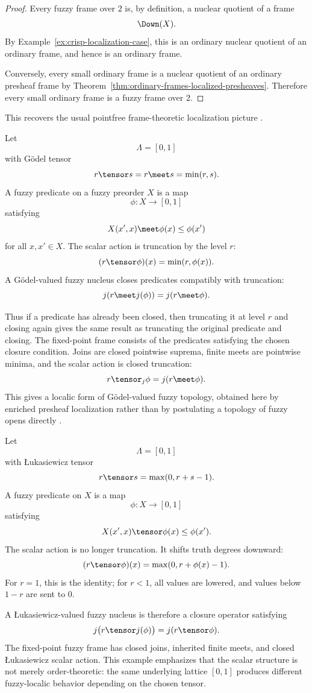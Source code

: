 \begin{proof}
Every fuzzy frame over \(2\) is, by definition, a nuclear quotient of a frame
\[
    \Down(X).
\]
By Example~\ref{ex:crisp-localization-case}, this is an ordinary nuclear quotient of
an ordinary frame, and hence is an ordinary frame.

Conversely, every small ordinary frame is a nuclear quotient of an ordinary presheaf
frame by Theorem~\ref{thm:ordinary-frames-localized-presheaves}. Therefore every
small ordinary frame is a fuzzy frame over \(2\).
\end{proof}

This recovers the usual pointfree frame-theoretic localization picture
\cite{Johnstone1982}.

\begin{example}
\label{ex:godel-valued-localizations}
Let
\[
    \Lambda=[0,1]
\]
with G\"odel tensor
\[
    r\tensor s=r\meet s=\min(r,s).
\]
A fuzzy predicate on a fuzzy preorder \(X\) is a map
\[
    \phi:X\to[0,1]
\]
satisfying
\[
    X(x',x)\meet\phi(x)\leq \phi(x')
\]
for all \(x,x'\in X\). The scalar action is truncation by the level \(r\):
\[
    (r\tensor\phi)(x)=\min(r,\phi(x)).
\]
A G\"odel-valued fuzzy nucleus closes predicates compatibly with truncation:
\[
    j(r\meet j(\phi))=j(r\meet\phi).
\]

Thus if a predicate has already been closed, then truncating it at level \(r\) and
closing again gives the same result as truncating the original predicate and closing.
The fixed-point frame consists of the predicates satisfying the chosen closure
condition. Joins are closed pointwise suprema, finite meets are pointwise minima, and
the scalar action is closed truncation:
\[
    r\tensor_j\phi=j(r\meet\phi).
\]
This gives a localic form of G\"odel-valued fuzzy topology, obtained here by enriched
presheaf localization rather than by postulating a topology of fuzzy opens directly
\cite{HohleRodabaugh1999}.
\end{example}

\begin{example}
\label{ex:lukasiewicz-valued-localizations}
Let
\[
    \Lambda=[0,1]
\]
with {\L}ukasiewicz tensor
\[
    r\tensor s=\max(0,r+s-1).
\]
A fuzzy predicate on \(X\) is a map
\[
    \phi:X\to[0,1]
\]
satisfying
\[
    X(x',x)\tensor\phi(x)\leq \phi(x').
\]
The scalar action is no longer truncation. It shifts truth degrees downward:
\[
    (r\tensor\phi)(x)=\max(0,r+\phi(x)-1).
\]
For \(r=1\), this is the identity; for \(r<1\), all values are lowered, and values
below \(1-r\) are sent to \(0\).

A {\L}ukasiewicz-valued fuzzy nucleus is therefore a closure operator satisfying
\[
    j\bigl(r\tensor j(\phi)\bigr)=j(r\tensor\phi).
\]
The fixed-point fuzzy frame has closed joins, inherited finite meets, and closed
{\L}ukasiewicz scalar action. This example emphasizes that the scalar structure is not
merely order-theoretic: the same underlying lattice \([0,1]\) produces different
fuzzy-localic behavior depending on the chosen tensor.
\end{example}

